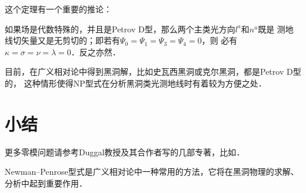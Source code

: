 这个定理有一个重要的推论：
\begin{corollary}\label{chnull:thm_BHD}
    如果场是代数特殊的，并且是Petrov D型，那么两个主类光方向$l^a$和$n^a$既是
    测地线切矢量又是无剪切的；即若有$\Psi_0=\Psi_1=\Psi_3=\Psi_4=0$，则
    必有$\kappa=\sigma=\nu=\lambda=0$．反之亦然．
\end{corollary}

目前，在广义相对论中得到黑洞解，比如史瓦西黑洞或克尔黑洞，都是Petrov D型的，
这种情形使得NP型式在分析黑洞类光测地线时有着较为方便之处．




\section*{小结}

更多零模问题请参考Duggal教授及其合作者写的几部专著，比如\parencite{Duggal-Bejancu-1996}．

Newman--Penrose型式是广义相对论中一种常用的方法，它将在黑洞物理的求解、分析中起到重要作用．




\printbibliography[heading=subbibliography,title=第\ref{chnull}章参考文献]

\endinput